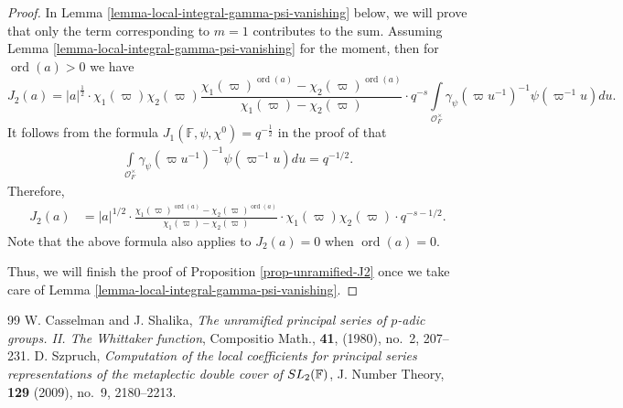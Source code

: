 \documentclass[10pt,a4paper]{amsart}
\newcommand{\on}{\operatorname}
\newcommand{\ord}{\on{ord}}
\begin{document}
\begin{proof}
In Lemma \ref{lemma-local-integral-gamma-psi-vanishing} below, we will prove that only the term corresponding to $m=1$ contributes to the sum. Assuming Lemma \ref{lemma-local-integral-gamma-psi-vanishing} for the moment, then for $\ord(a)>0$ we have
\begin{equation*}
J_2(a)= |a|^{\frac{1}{2}} \cdot  \chi_1(\varpi)\chi_2(\varpi)  
\frac{\chi_1(\varpi)^{\ord(a)}-\chi_2(\varpi)^{\ord(a)}}{\chi_1(\varpi)-\chi_2(\varpi)}   \cdot q^{-s}      \int\limits_{\mathcal{O}_F^\times} \gamma_\psi( \varpi u^{-1})^{-1}  \psi( \varpi^{-1} u)du.
\end{equation*}
It follows from the formula $J_1(\mathbb{F},\psi,\chi^0)=q^{-\frac{1}{2}}$ in the proof of \cite[Lemma 1.12]{Szpruch2009} that
\begin{equation*}
\begin{split}
\int\limits_{\mathcal{O}_F^\times} \gamma_\psi( \varpi u^{-1})^{-1}  \psi(\varpi^{-1} u )  du =q^{-1/2} .
\end{split}
\end{equation*}
Therefore, 
\begin{equation*}
\begin{split}
J_2(a) &=   |a|^{1/2}\cdot   \frac{\chi_1(\varpi)^{\ord(a)}  - \chi_2(\varpi)^{\ord(a)} }{\chi_1(\varpi)-\chi_2(\varpi)} \cdot  \chi_1(\varpi)\chi_2(\varpi)  \cdot  q^{-s-1/2} .
\end{split}
\end{equation*}
Note that the above formula also applies to $J_2(a)=0$ when $\ord(a)=0$.

Thus, we will finish the proof of Proposition \ref{prop-unramified-J2} once we take care of Lemma \ref{lemma-local-integral-gamma-psi-vanishing}.
\end{proof}

\begin{thebibliography}{99}
 W. Casselman and J. Shalika, \textit{The unramified principal series of {$p$}-adic groups. {II}. {T}he {W}hittaker function}, Compositio Math., \textbf{41}, (1980), no.~2, 207--231.
 D. Szpruch, \textit{Computation of the local coefficients for principal series representations of the metaplectic double cover of {${\rm SL}_2(\mathbb{F})$}}, J. Number Theory, \textbf{129} (2009), no.~9, 2180--2213.
\end{thebibliography}
\end{document}
